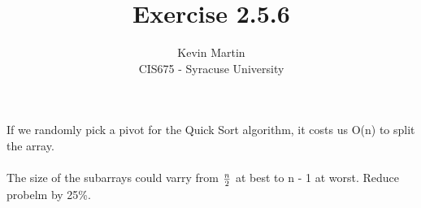 \documentclass{article}
\author{Kevin Martin\\ CIS675 - Syracuse University}
\title{Exercise 2.5.6}
\begin{document}
\maketitle

If we randomly pick a pivot for the Quick Sort algorithm, it costs us O(n) to split the array. \\\\
The size of the subarrays could varry from \(n\over 2\) at best to n - 1 at worst. Reduce probelm by 25\%.
\end{document}
